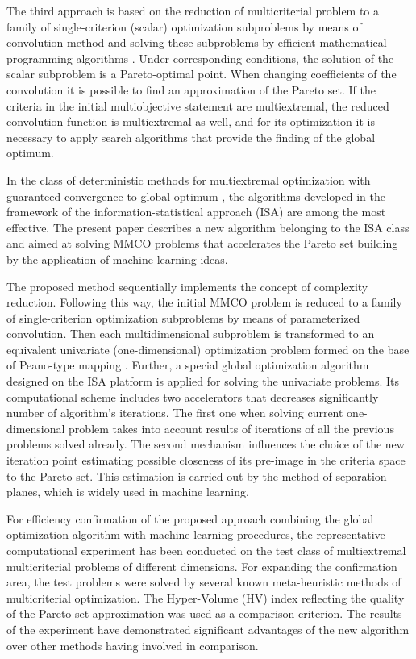 \documentclass[runningheads]{llncs}
\begin{document}
The third approach is based on the reduction of multicriterial problem to a family of single-criterion (scalar) optimization subproblems by means of convolution method and solving these subproblems by efficient mathematical programming algorithms \cite{Collette2004,Marler2009,Marler2004,Pardalos2017,Wierzbicki,Ehrgott2005,GergelKozinov2020}. Under corresponding conditions, the solution of the scalar subproblem is a Pareto-optimal point. When changing coefficients of the convolution it is possible to find an approximation of the Pareto set. If the criteria in the initial multiobjective statement are multiextremal, the reduced convolution function is multiextremal as well, and for its optimization it is necessary to apply search algorithms that provide the finding of the global optimum. 

In the class of deterministic methods for multiextremal optimization with guaranteed convergence to global optimum \cite{Gablonsky2001,Sergeyev2010,Sergeyev2006,Evtushenko2014,Strongin2003,Sergeyev2013}, the algorithms developed in the framework of the information-statistical approach (ISA) \cite{Gergel2018,Barkalov2018} are among the most effective. The present paper describes a new algorithm belonging to the ISA class and aimed at solving MMCO problems that accelerates the Pareto set building by the application of machine learning ideas. 

The proposed method sequentially implements the concept of complexity reduction. Following this way, the initial MMCO problem is reduced to a family of single-criterion optimization subproblems by means of parameterized convolution. Then each multidimensional subproblem is transformed to an equivalent univariate (one-dimensional) optimization problem formed on the base of Peano-type mapping \cite{Evtushenko2014,Gergel2018,Marler2004,Pardalos2017}. Further, a special global optimization algorithm designed on the ISA platform is applied for solving the univariate problems. Its computational scheme includes two accelerators that decreases significantly number of algorithm's iterations. The first one when solving current one-dimensional problem takes into account results of iterations of all the previous problems solved already. The second mechanism influences the choice of the new iteration point estimating possible closeness of its pre-image in the criteria space to the Pareto set. This estimation is carried out by the method of separation planes, which is widely used in machine learning. 

For efficiency confirmation of the proposed approach combining the global optimization algorithm with machine learning procedures, the representative computational experiment has been conducted on the test class of multiextremal multicriterial problems of different dimensions. For expanding the confirmation area, the test problems were solved by several known meta-heuristic methods of multicriterial optimization. The Hyper-Volume (HV) index reflecting the quality of the Pareto set approximation was used as a comparison criterion. The results of the experiment have demonstrated significant advantages of the new algorithm over other methods having involved in comparison.
\end{document}
